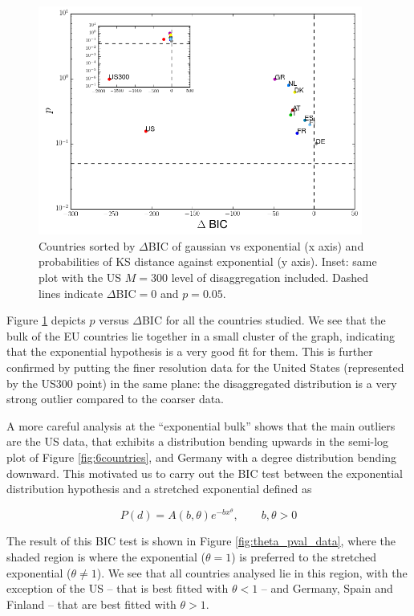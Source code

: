\begin{figure}[!ht]
  \centering
  \includegraphics[width=0.95\textwidth]{figs_io/bic_pval_countries.png}
  \caption{Countries sorted by $\Delta$BIC of gaussian vs exponential
    (x axis) and probabilities of KS distance against exponential (y
    axis). Inset: same plot with the US $M=300$ level of
    disaggregation included. Dashed lines indicate $\Delta$BIC$=0$ and
    $p=0.05$.}
  \label{fig:BICpval}
\end{figure}

Figure \ref{fig:BICpval} depicts $p$ versus $\Delta$BIC for all the countries studied. We see that the bulk of the EU countries lie together in a
small cluster of the graph, indicating that the exponential hypothesis
is a very good fit for them. This is further confirmed
by putting the finer resolution data for the United States
(represented by the US300 point) in the same plane: the disaggregated
distribution is a very strong outlier compared to the coarser data.

A more careful analysis at the ``exponential bulk'' shows that the
main outliers are the US data, that exhibits a distribution bending
upwards in the semi-log plot of Figure \ref{fig:6countries}, and
Germany with a degree distribution bending downward. This motivated us
to carry out the BIC test between the exponential distribution
hypothesis and a stretched exponential defined as

\begin{equation}
\label{eq:stretched_exp}
P(d)=A(b,\theta)e^{-b x^\theta},\qquad b,\theta>0
\end{equation}

The result of this BIC test is shown in Figure
\ref{fig:theta_pval_data}, where the shaded region is where the
exponential ($\theta = 1$) is preferred to the stretched exponential
($\theta \neq 1$). We see that all countries analysed lie in this
region, with the exception of the US -- that is best fitted with $\theta<1$ -- and
Germany, Spain and Finland -- that are best fitted with $\theta>1$.

